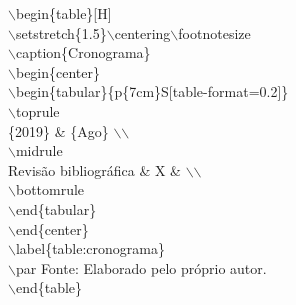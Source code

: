{\begin{tcolorbox}[colback=blue!5!white,colframe=green!75!blue,title= Comando Adiciona Tabela, fontupper=\footnotesize, fontlower=\footnotesize]
\tcblower
$\backslash$begin\{table\}[H]\\
\tab $\backslash$setstretch\{1.5\}$\backslash$centering$\backslash$footnotesize\\
\tab $\backslash$caption\{Cronograma\} \\
\tab $\backslash$begin\{center\} \\
\tab \tab $\backslash$begin\{tabular\}\{p\{7cm\}S[table-format=0.2]\}\\
\tab \tab \tab $\backslash$toprule \\
\tab \tab \tab \{2019\} \& \{Ago\} $\backslash$$\backslash$\\
\tab \tab \tab $\backslash$midrule\\
\tab \tab \tab Revisão bibliográfica  \& X \&  $\backslash$$\backslash$\\
\tab \tab \tab $\backslash$bottomrule\\
\tab \tab $\backslash$end\{tabular\} \\
\tab $\backslash$end\{center\} \\
\tab $\backslash$label\{table:cronograma\} \\
\tab $\backslash$par Fonte: Elaborado pelo próprio autor. \\
$\backslash$end\{table\} \\
\end{tcolorbox}
}

